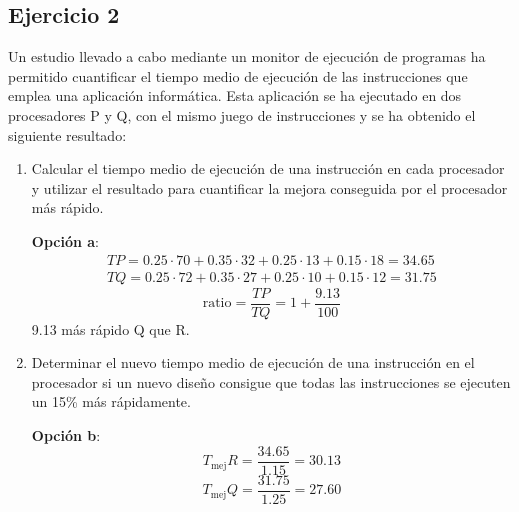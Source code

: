 \subsection{Ejercicio 2}
\noindent
Un estudio llevado a cabo mediante un monitor de ejecución de programas ha permitido cuantificar el tiempo medio de ejecución de las instrucciones que emplea una aplicación informática. Esta aplicación se ha ejecutado en dos procesadores P y Q, con el mismo juego de instrucciones y se ha obtenido el siguiente resultado:
\begin{table}[H]
\centering
{}
\end{table}
\begin{enumerate}
    \item Calcular el tiempo medio de ejecución de una instrucción en cada procesador y utilizar el resultado para cuantificar la mejora conseguida por el procesador más rápido.
\begin{tcolorbox}[colback=white,colframe=cyan!50!black,fonttitle=\bfseries]
\textbf{Opción a}:
\[\left.\begin{array}{ll}
TP=0.25\cdot 70+0.35\cdot32+0.25\cdot 13+0.15\cdot 18=34.65\\
TQ=0.25\cdot 72+0.35\cdot 27+0.25\cdot 10+0.15\cdot 12=31.75
\end{array}\right.
\]
\[
\text{ratio}=\dfrac{TP}{TQ}=1+\dfrac{9.13}{100}
\]
9.13 más rápido Q que R.
\end{tcolorbox}    
    \item Determinar el nuevo tiempo medio de ejecución de una instrucción en el procesador si un nuevo diseño consigue que todas las instrucciones se ejecuten un 15\% más rápidamente.
\begin{tcolorbox}[colback=white,colframe=cyan!50!black,fonttitle=\bfseries]
\textbf{Opción b}:
\[
T_{\text{mej}}R=\dfrac{34.65}{1.15}=30.13
\]
\[
T_{\text{mej}}Q=\dfrac{31.75}{1.25}=27.60
\]
\end{tcolorbox}    
\end{enumerate}
